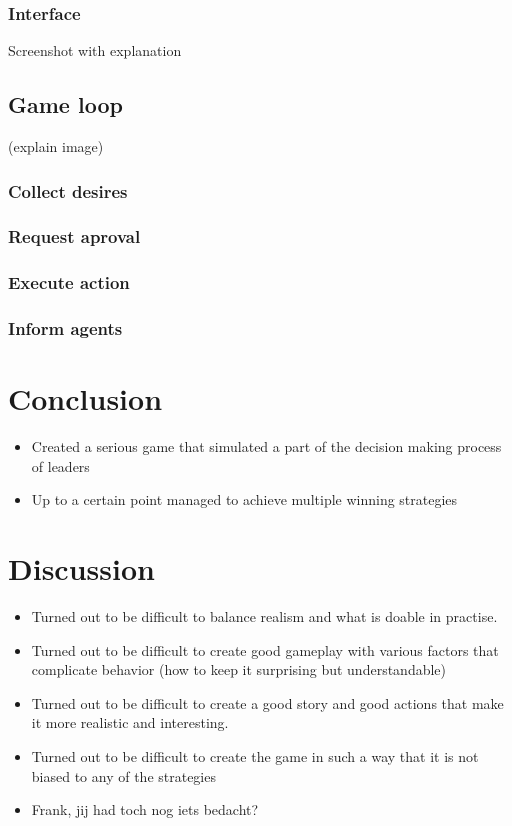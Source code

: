 \documentclass[11pt,a4paper]{article}
\begin{document}
    \subsubsection{Interface}
    Screenshot with explanation
  \subsection{Game loop} 
  (explain image)
    \subsubsection{Collect desires}
    \subsubsection{Request aproval}
    \subsubsection{Execute action}
    \subsubsection{Inform agents}
\section{Conclusion}
  \begin{itemize}
    \item Created a serious game that simulated a part of the decision making process of leaders
    \item Up to a certain point managed to achieve multiple winning strategies
  \end{itemize}
\section{Discussion}
  \begin{itemize}
    \item Turned out to be difficult to balance realism and what is doable in practise.
    \item Turned out to be difficult to create good gameplay with various factors that complicate behavior (how to keep it surprising but understandable)
    \item Turned out to be difficult to create a good story and good actions that make it more realistic and interesting.
    \item Turned out to be difficult to create the game in such a way that it is not biased to any of the strategies
    \item Frank, jij had toch nog iets bedacht?
  \end{itemize}
\end{document}
